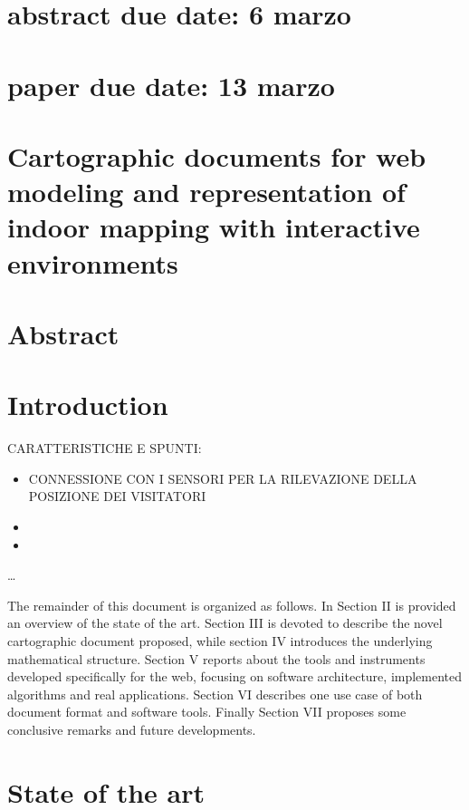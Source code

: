 \documentclass[]{article}
\date{}
\begin{document}
\section{abstract due date: 6 marzo}\label{abstract-due-date-6-marzo}

\section{paper due date: 13 marzo}\label{paper-due-date-13-marzo}

\section{Cartographic documents for web modeling and representation of
indoor mapping with interactive
environments}\label{cartographic-documents-for-web-modeling-and-representation-of-indoor-mapping-with-interactive-environments}

\section{Abstract}\label{abstract}

\section{Introduction}\label{introduction}

CARATTERISTICHE E SPUNTI:

\begin{itemize}
\item
  CONNESSIONE CON I SENSORI PER LA RILEVAZIONE DELLA POSIZIONE DEI
  VISITATORI
\item
\item
\end{itemize}

\ldots{}

The remainder of this document is organized as follows. In Section II is
provided an overview of the state of the art. Section III is devoted to
describe the novel cartographic document proposed, while section IV
introduces the underlying mathematical structure. Section V reports
about the tools and instruments developed specifically for the web,
focusing on software architecture, implemented algorithms and real
applications. Section VI describes one use case of both document format
and software tools. Finally Section VII proposes some conclusive remarks
and future developments.

\section{State of the art}\label{state-of-the-art}
\end{document}
